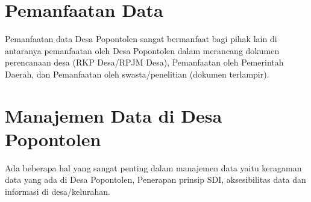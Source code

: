 \section{Pemanfaatan Data}

Pemanfaatan data Desa Popontolen sangat bermanfaat bagi pihak lain di antaranya pemanfaatan oleh Desa Popontolen dalam merancang dokumen perencanaan desa (RKP Desa/RPJM Desa), Pemanfaatan oleh Pemerintah Daerah, dan Pemanfaatan oleh swasta/penelitian (dokumen terlampir).

\section{Manajemen Data di Desa Popontolen}

Ada beberapa hal yang sangat penting dalam manajemen data yaitu keragaman data yang ada di Desa Popontolen, Penerapan prinsip SDI, aksesibilitas data dan informasi di desa/kelurahan.
